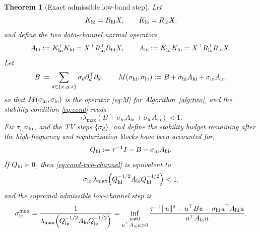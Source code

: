 \documentclass{article}
\newtheorem{theorem}{Theorem}
\begin{document}
\begin{theorem}[Exact admissible low-band step]
\label{thm:two-channel}
Let
\[
K_{\rm hi}=R_{\rm hi}X,
\qquad
K_{\rm lo}=R_{\rm lo}X,
\]
and define the two data-channel normal operators
\[
A_{\rm hi}:=K_{\rm hi}^{\top}K_{\rm hi}
=
X^\top R_{\rm hi}^{\top}R_{\rm hi}X,
\qquad
A_{\rm lo}:=K_{\rm lo}^{\top}K_{\rm lo}
=
X^\top R_{\rm lo}^{\top}R_{\rm lo}X .
\]
Let
\[
B:=
\sum_{d\in\{x,y,z\}}
\sigma_d\partial_d^\top\partial_d,
\qquad
M(\sigma_{\rm hi},\sigma_{\rm lo})
:=
B+\sigma_{\rm hi}A_{\rm hi}
+\sigma_{\rm lo}A_{\rm lo},
\]
so that $M(\sigma_{\rm hi},\sigma_{\rm lo})$ is the operator \eqref{eq:M} for Algorithm~\ref{alg:two}, and the stability condition \eqref{eq:cond} reads
\begin{equation}
\label{eq:cond-two-channel}
\tau\lambda_{\max}
\!\left(
B+\sigma_{\mathrm{hi}}A_{\mathrm{hi}}
+\sigma_{\mathrm{lo}}A_{\mathrm{lo}}
\right)<1.
\end{equation}
Fix $\tau$, $\sigma_{\rm hi}$, and the TV steps $\{\sigma_d\}$, and define the stability budget remaining after the high-frequency and regularization blocks have been accounted for,
\begin{equation}
\label{eq:Qhi}
Q_{\rm hi}
:=
\tau^{-1}I
-
B
-
\sigma_{\rm hi}A_{\rm hi}.
\end{equation}
If $Q_{\rm hi}\succ0$, then \eqref{eq:cond-two-channel} is equivalent to
\begin{equation}
\label{eq:sigma-lo-exact}
\sigma_{\rm lo}\,
\lambda_{\max}
\!\left(
Q_{\rm hi}^{-1/2}
A_{\rm lo}
Q_{\rm hi}^{-1/2}
\right)
<1,
\end{equation}
and the supremal admissible low-channel step is
\begin{equation}
\label{eq:sigma-lo-max}
\sigma_{\rm lo}^{\max}
=
\frac{1}{
\lambda_{\max}
\!\left(
Q_{\rm hi}^{-1/2}
A_{\rm lo}
Q_{\rm hi}^{-1/2}
\right)
}
=
\inf_{\substack{u\neq0\\u^\top A_{\mathrm{lo}}u>0}}
\frac{
\tau^{-1}\|u\|^2
-
u^\top Bu
-
\sigma_{\mathrm{hi}}u^\top A_{\mathrm{hi}}u
}{
u^\top A_{\mathrm{lo}}u
}.
\end{equation}
\end{theorem}
\end{document}
